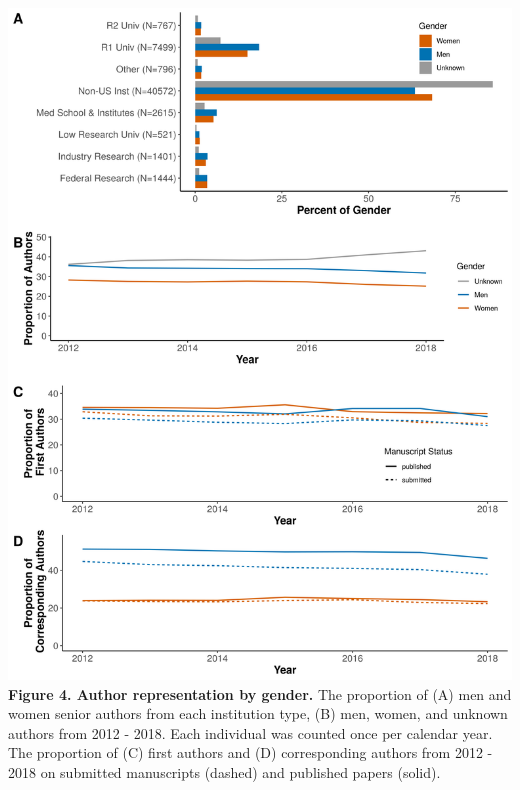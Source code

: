 \documentclass[11pt,]{article}
\begin{document}
\includegraphics{Figure_3.png} \textbf{Figure 4. Author representation
by gender.} The proportion of (A) men and women senior authors from each
institution type, (B) men, women, and unknown authors from 2012 - 2018.
Each individual was counted once per calendar year. The proportion of
(C) first authors and (D) corresponding authors from 2012 - 2018 on
submitted manuscripts (dashed) and published papers (solid).

\newpage
\end{document}

